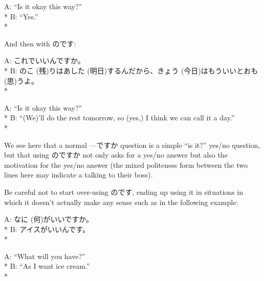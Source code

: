\documentclass[11pt, b5paper, twoside, openright, onecolumn]{book}
\makeatletter
\newcommand*{\rubystack}[2]{{\relscale{0.5}%
  \begin{tabular}[b]{@{}c@{}}%
    {#1}\\%
   {\textscale{2}{#2}}%
  \end{tabular}}%
}
\DeclareRobustCommand*{\ruby}[2]{%
  \mbox{%
    \setlength{\parskip}{0ex}%
    \BeginAccSupp{method=pdfstringdef,ActualText={#1}}%
      \rubystack{\phantom{#2}}{#1}%
      \llap{%
        \rubystack{#2}{\phantom{#1}}%
      }%
    \EndAccSupp{}%
  }%
}
\renewcommand*{\ruby}[2]{#2 (#1)}%
\newenvironment{exampleblock}{
\setlength{\parindent}{0.6in}
\begin{minipage}[t]{\dimexpr\textwidth-\parindent}}
{\end{minipage}}
\makeatother
\begin{document}
\begin{exampleblock}
A: “Is it okay this way?” \\* 
B: “Yes.” \\* 
\end{exampleblock}
\vspace{0.2cm}

And then with のです:

\vspace{0.4cm}
\begin{exampleblock}
A: これでいいんですか。 \\* 
B: \ruby{残}{のこ}りは\ruby{明日}{あした}するんだから、\ruby{今日}{きょう}はもういいと\ruby{思}{おも}うよ。 \\* 
\end{exampleblock}
\vspace{0.2cm}

\begin{exampleblock}
A: “Is it okay this way?” \\* 
B: “(We)’ll do the rest tomorrow‚ so (yes‚) I think we can call it a day.” \\* 
\end{exampleblock}
\vspace{0.2cm}

We see here that a normal —ですか question is a simple “is it?” yes/no question‚ but that using のですか not only asks for a yes/no answer but also the motivation for the yes/no answer (the mixed politeness form between the two lines here may indicate a  talking to their boss).

Be careful not to start over-using のです‚ ending up using it in situations in which it doesn’t actually make any sense such as in the following example:

\vspace{0.4cm}
\begin{exampleblock}
A: \ruby{何}{なに}がいいですか。 \\* 
B: アイスがいいんです。 \\* 
\end{exampleblock}
\vspace{0.2cm}

\begin{exampleblock}
A: “What will you have?” \\* 
B: “As I want ice cream.” \\* 
\end{exampleblock}
\vspace{0.2cm}
\end{document}
